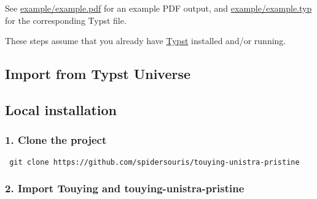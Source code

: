 See
\href{https://github.com/typst/packages/raw/main/packages/preview/touying-unistra-pristine/1.2.0/example/example.pdf}{example/example.pdf}
for an example PDF output, and
\href{https://github.com/typst/packages/raw/main/packages/preview/touying-unistra-pristine/1.2.0/example/example.typ}{example/example.typ}
for the corresponding Typst file.

These steps assume that you already have
\href{https://typst.app/}{Typst} installed and/or running.

\subsection{Import from Typst
Universe}\label{import-from-typst-universe}

\begin{Shaded}
\begin{Highlighting}[]

\NormalTok{  ),}
\NormalTok{)}





\end{Highlighting}
\end{Shaded}

\subsection{Local installation}\label{local-installation}

\subsubsection{1. Clone the project}\label{clone-the-project}

\texttt{\ git\ clone\ https://github.com/spidersouris/touying-unistra-pristine\ }

\subsubsection{2. Import Touying and
touying-unistra-pristine}\label{import-touying-and-touying-unistra-pristine}

